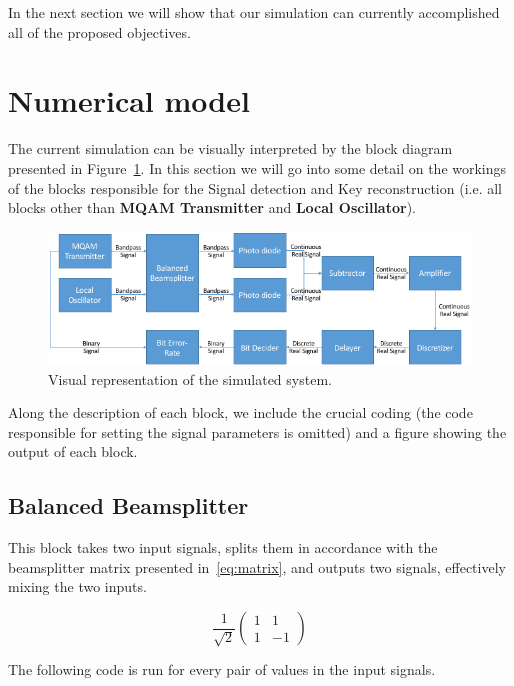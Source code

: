 \documentclass{article}
\begin{document}
In the next section we will show that our simulation can currently accomplished all of the proposed objectives.

\section{Numerical model}

The current simulation can be visually interpreted by the block diagram presented in Figure~\ref{fig:simulatedsystem}. In this section we will go into some detail on the workings of the blocks responsible for the Signal detection and Key reconstruction (i.e. all blocks other than \textbf{MQAM Transmitter} and \textbf{Local Oscillator}).

\begin{figure}[h]
\centering
\includegraphics[width=\linewidth]{simulatedsystem.png}
\caption{Visual representation of the simulated system.}
\label{fig:simulatedsystem}
\end{figure}

Along the description of each block, we include the crucial coding (the code responsible for setting the signal parameters is omitted) and a figure showing the output of each block.


\subsection{Balanced Beamsplitter}

This block takes two input signals, splits them in accordance with the beamsplitter matrix presented in~\eqref{eq:matrix}, and outputs two signals, effectively mixing the two inputs.

\begin{equation}\label{eq:matrix}
\frac{1}{\sqrt{2}}
\begin{pmatrix}
1 & 1\\
1 & -1
\end{pmatrix}
\end{equation}

The following code is run for every pair of values in the input signals.
\end{document}
